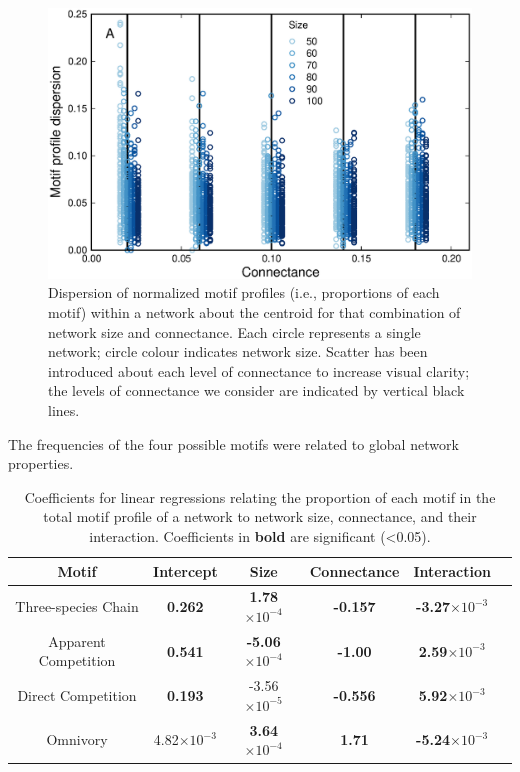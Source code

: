 \documentclass[12pt]{article}
\begin{document}
\begin{spacing}{2.0}
   \begin{figure}[h!]
       \centering
       \includegraphics[width=.75\textwidth]{figures/proportion_profile_dispersion.eps}
       \caption{Dispersion of normalized motif profiles (i.e., proportions of each motif) within a network about the centroid for that combination of network size and connectance. Each circle represents a single network; circle colour indicates network size. Scatter has been introduced about each level of connectance to increase visual clarity; the levels of connectance we consider are indicated by vertical black lines.}
       \label{dispersion_normmotifs}
    \end{figure}


    The frequencies of the four possible motifs were related to global network properties.

    \begin{table}[hb!]
        \centering
        \caption{Coefficients for linear regressions relating the proportion of each motif in the total motif profile of a network to network size, connectance, and their interaction. Coefficients in \textbf{bold} are significant (\textless0.05).}
       \label{network_prop_lms}
       \begin{tabular}{c|c c c c c}
            Motif & Intercept & Size & Connectance & Interaction \\
            \hline
            Three-species Chain & \textbf{0.262} & \textbf{1.78$\times10^{-4}$} & \textbf{-0.157} & \textbf{-3.27$\times10^{-3}$} \\
            Apparent Competition & \textbf{0.541} & \textbf{-5.06$\times10^{-4}$} & \textbf{-1.00} & \textbf{2.59$\times10^{-3}$} \\
            Direct Competition & \textbf{0.193} & -3.56$\times10^{-5}$ & \textbf{-0.556} & \textbf{5.92$\times10^{-3}$} \\
            Omnivory & 4.82$\times10^{-3}$ & \textbf{3.64$\times10^{-4}$} & \textbf{1.71} & \textbf{-5.24$\times10^{-3}$}\\
            \hline
            \end{tabular}
    \end{table}        
\clearpage
    

\end{spacing}
\end{document}
